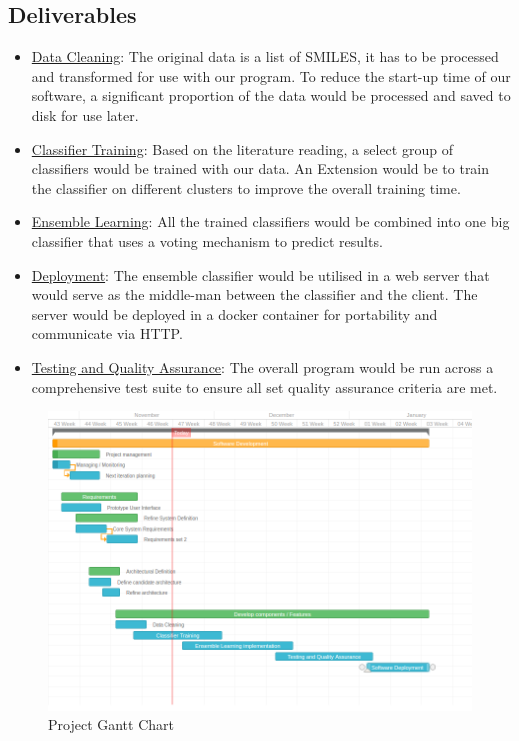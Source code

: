 \documentclass[a4paper,12pt]{article}
\begin{document}
		\subsection{Deliverables}
			\begin{itemize}
				\item \underline{Data Cleaning}: The original data is a list of SMILES, it has to be processed and transformed for use with our program. To reduce the start-up time of our software, a significant proportion of the data would be processed and saved to disk for use later.
				\item \underline{Classifier Training}: Based on the literature reading, a select group of classifiers would be trained with our data. An Extension would be to train the classifier on different clusters to improve the overall training time.
				\item \underline{Ensemble Learning}: All the trained classifiers would be combined into one big classifier that uses a voting mechanism to predict results.
				\item \underline{Deployment}: The ensemble classifier would be utilised in a web server that would serve as the middle-man between the classifier and the client. The server would be deployed in a docker container for portability and communicate via HTTP.
				\item \underline{Testing and Quality Assurance}: The overall program would be run across a comprehensive test suite to ensure all set quality assurance criteria are met.
			\end{itemize}
			\begin{figure}[H]
				\centering
				\includegraphics[width=\textwidth,scale=1]{images/bbb_gantt}
				\caption{Project Gantt Chart}
				\label{fig:bbb_gantt}
			\end{figure}
\end{document}
